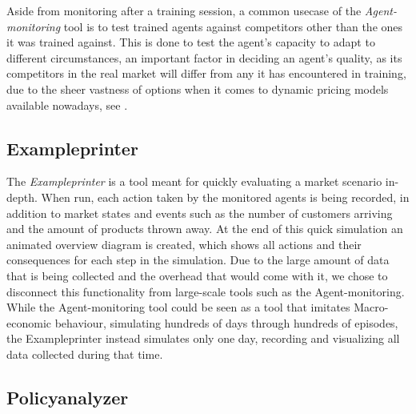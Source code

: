 Aside from monitoring after a training session, a common usecase of the \emph{Agent-monitoring} tool is to test trained agents against competitors other than the ones it was trained against. This is done to test the agent's capacity to adapt to different circumstances, an important factor in deciding an agent's quality, as its competitors in the real market will differ from any it has encountered in training, due to the sheer vastness of options when it comes to dynamic pricing models available nowadays, see .

\subsection*{Exampleprinter}\label{subsec:Exampleprinter}

The \emph{Exampleprinter} is a tool meant for quickly evaluating a market scenario in-depth. When run, each action taken by the monitored agents is being recorded, in addition to market states and events such as the number of customers arriving and the amount of products thrown away. At the end of this quick simulation an animated overview diagram is created, which shows all actions and their consequences for each step in the simulation. Due to the large amount of data that is being collected and the overhead that would come with it, we chose to disconnect this functionality from large-scale tools such as the Agent-monitoring. While the Agent-monitoring tool could be seen as a tool that imitates Macro-economic behaviour, simulating hundreds of days through hundreds of episodes, the Exampleprinter instead simulates only one day, recording and visualizing all data collected during that time.

\subsection*{Policyanalyzer}\label{subsec:Policyanalyzer}


